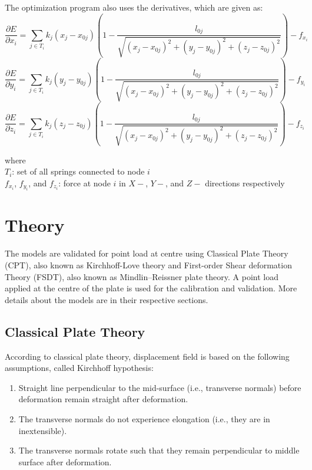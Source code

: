 The optimization program also uses the derivatives, which are given as:
\begin{equation}
    \frac{\partial E}{\partial x_i} = \sum_{j \in T_i} k_j(x_j - x_{0j})(1 - \frac{l_{0j}}{\sqrt{(x_j - x_{0j})^2 + (y_j - y_{0j})^2 + (z_j - z_{0j})^2}}) - f_{x_i}
\end{equation}
\begin{equation}
    \frac{\partial E}{\partial y_i} = \sum_{j \in T_i} k_j(y_j - y_{0j})(1 - \frac{l_{0j}}{\sqrt{(x_j - x_{0j})^2 + (y_j - y_{0j})^2 + (z_j - z_{0j})^2}}) - f_{y_i}
\end{equation}
\begin{equation}
    \frac{\partial E}{\partial z_i} = \sum_{j \in T_i} k_j(z_j - z_{0j})(1 - \frac{l_{0j}}{\sqrt{(x_j - x_{0j})^2 + (y_j - y_{0j})^2 + (z_j - z_{0j})^2}}) - f_{z_i}
\end{equation}

where\\
$T_i$: set of all springs connected to node $i$\\
$f_{x_i}$, $f_{y_i}$, and $f_{z_i}$: force at node $i$ in $X-$, $Y-$, and $Z-$ directions respectively

\section{Theory}
The models are validated for point load at centre using Classical Plate Theory (CPT), also known as Kirchhoff-Love theory and First-order Shear deformation Theory (FSDT), also known as Mindlin–Reissner plate theory. A point load applied at the centre of the plate is used for the calibration and validation. More details about the models are in their respective sections.\cite{reddy2006theory}\cite{timoshenko1959theory}

\subsection{Classical Plate Theory}
According to classical plate theory, displacement field is based on the following assumptions, called Kirchhoff hypothesis:
\begin{enumerate}
    \item Straight line perpendicular to the mid-surface (i.e., transverse normals) before deformation remain straight after deformation.
    \item The transverse normals do not experience elongation (i.e., they are in inextensible).
    \item The transverse normals rotate such that they remain perpendicular to middle surface after deformation.
\end{enumerate}

